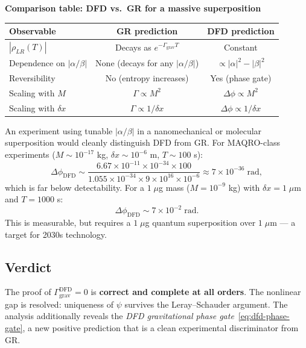 \documentclass[11pt]{article}
\theoremstyle{definition}
\theoremstyle{remark}
\begin{document}
\textbf{Comparison table: DFD vs.\ GR for a massive superposition}

\begin{center}
\begin{tabular}{lcc}
\toprule
Observable & GR prediction & DFD prediction \\
\midrule
$|\rho_{LR}(T)|$ & Decays as $e^{-\Gamma_{\mathrm{grav}}T}$ & Constant \\
Dependence on $|\alpha/\beta|$ & None (decays for any $|\alpha/\beta|$) & $\propto |\alpha|^2 - |\beta|^2$ \\
Reversibility & No (entropy increases) & Yes (phase gate) \\
Scaling with $M$ & $\Gamma \propto M^2$ & $\Delta\phi \propto M^2$ \\
Scaling with $\delta x$ & $\Gamma \propto 1/\delta x$ & $\Delta\phi \propto 1/\delta x$ \\
\bottomrule
\end{tabular}
\end{center}

An experiment using tunable $|\alpha/\beta|$ in a nanomechanical or molecular
superposition would cleanly distinguish DFD from GR.  For MAQRO-class experiments
($M \sim 10^{-17}$ kg, $\delta x \sim 10^{-6}$ m, $T \sim 100$ s):
\begin{equation}
  \Delta\phi_{\mathrm{DFD}} \sim \frac{6.67\times10^{-11}\times10^{-34}
  \times100}{1.055\times10^{-34}\times9\times10^{16}\times10^{-6}}
  \approx 7\times10^{-36}\;\mathrm{rad}, \label{eq:maqro-phase}
\end{equation}
which is far below detectability.  For a $1\;\mu$g mass ($M = 10^{-9}$ kg) with
$\delta x = 1\;\mu$m and $T = 1000$ s:
\begin{equation}
  \Delta\phi_{\mathrm{DFD}} \sim 7\times10^{-2}\;\mathrm{rad}. \label{eq:future-phase}
\end{equation}
This is measurable, but requires a $1\;\mu$g quantum superposition over $1\;\mu$m
--- a target for 2030s technology.

\subsection{Verdict}

The proof of $\Gamma_{\mathrm{grav}}^{\mathrm{DFD}} = 0$ is \textbf{correct and
complete at all orders}.  The nonlinear gap is resolved: uniqueness of $\psi$
survives the Leray--Schauder argument.  The analysis additionally reveals the
\emph{DFD gravitational phase gate}~\eqref{eq:dfd-phase-gate}, a new positive
prediction that is a clean experimental discriminator from GR.
\end{document}
